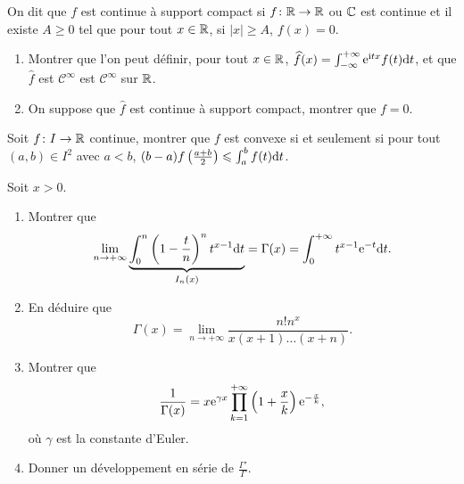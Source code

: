 \begin{exercise}
    On dit que $f$ est continue à support compact si $f\colon\mathbb{R}\to\mathbb{R}$ ou $\mathbb{C}$ est continue et il existe $A\geqslant0$ tel que pour tout $x\in\mathbb{R}$, si $\left\lvert x\right\rvert\geqslant A$, $f(x)=0$.
    \begin{enumerate}
        \item Montrer que l'on peut définir, pour tout $x\in\mathbb{R}$, $\widehat{f}(x)=\int_{-\infty}^{+\infty}\mathrm{e}^{\mathrm{i} tx}f(t)\mathrm{d} t$, et que $\widehat{f}$ est $\mathcal{C}^{\infty}$ est $\mathcal{C}^{\infty}$ sur $\mathbb{R}$.
        \item On suppose que $\widehat{f}$ est continue à support compact, montrer que $f=0$.
    \end{enumerate}
\end{exercise}

\begin{exercise}
    Soit $f\colon I\to\mathbb{R}$ continue, montrer que $f$ est convexe si et seulement si pour tout $(a,b)\in I^{2}$ avec $a<b$, $(b-a)f\left(\frac{a+b}{2}\right)\leqslant\int_{a}^{b}f(t)\mathrm{d} t$.
\end{exercise}

\begin{exercise}
    Soit $x>0$.
    \begin{enumerate}
        \item Montrer que 
        \begin{equation}
            \lim\limits_{n\to+\infty}\underbrace{\int_{0}^{n}\left(1-\frac{t}{n}\right)^{n}t^{x-1}\mathrm{d} t}_{I_n(x)}=\Gamma(x)=\int_{0}^{+\infty}t^{x-1}\mathrm{e}^{-t}\mathrm{d} t.
        \end{equation}
        \item En déduire que 
        \begin{equation}
            \Gamma(x)=\lim\limits_{n\to+\infty}\frac{n!n^{x}}{x(x+1)\dots(x+n)}.
        \end{equation}
        \item Montrer que 
        \begin{equation}
            \frac{1}{\Gamma(x)}=x\mathrm{e}^{\gamma x}\prod_{k=1}^{+\infty}\left(1+\frac{x}{k}\right)\mathrm{e}^{-\frac{x}{k}},
        \end{equation}
        où $\gamma$ est la constante d'Euler.
        \item Donner un développement en série de $\frac{\Gamma'}{\Gamma}$.
    \end{enumerate}
\end{exercise}

